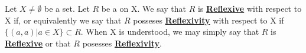 \newcommand{\ReflexiveRelation}[0]{\textbf{\hyperref[def:ReflexiveRelation]{Reflexive}}\xspace}
\newcommand{\RelationReflexivity}[0]{\textbf{\hyperref[def:ReflexiveRelation]{Reflexivity}}\xspace}
\begin{df}
\label{def:ReflexiveRelation}
    Let $X \neq \emptyset$ be a set. 
    Let $R$ be a \Relation on X. 
    We say that $R$ is 
    \ReflexiveRelation 
    with respect to X if, 
    or equivalently we say that
    $R$ posseses 
    \RelationReflexivity with respect to X
    if 
    $\{(a,a) | a \in X \} \subset R$.
    When X is understood, we may simply say that 
    $R$ is \ReflexiveRelation or that $R$
    posesses \RelationReflexivity. 
\end{df}
